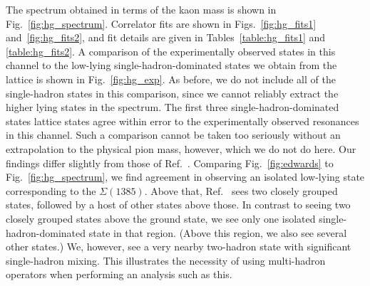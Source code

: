 The spectrum obtained in terms of the kaon mass is shown in Fig.~\ref{fig:hg_spectrum}. Correlator fits are shown in Figs.~\ref{fig:hg_fits1} and~\ref{fig:hg_fits2}, and fit details are given in Tables~\ref{table:hg_fits1} and \ref{table:hg_fits2}. A comparison of the experimentally observed states in this channel to the low-lying single-hadron-dominated states we obtain from the lattice is shown in Fig.~\ref{fig:hg_exp}. As before, we do not include all of the single-hadron states in this comparison, since we cannot reliably extract the higher lying states in the spectrum. The first three single-hadron-dominated states lattice states agree within error to the experimentally observed resonances in this channel. Such a comparison cannot be taken too seriously without an extrapolation to the physical pion mass, however, which we do not do here. Our findings differ slightly from those of Ref.~\cite{Edwards:2012fx}. Comparing Fig.~\ref{fig:edwards} to Fig.~\ref{fig:hg_spectrum}, we find agreement in observing an isolated low-lying state corresponding to the $\Sigma(1385)$. Above that, Ref.~\cite{Edwards:2012fx} sees two closely grouped states, followed by a host of other states above those. In contrast to seeing two closely grouped states above the ground state, we see only one isolated single-hadron-dominated state in that region. (Above this region, we also see several other states.) We, however, see a very nearby two-hadron state with significant single-hadron mixing. This illustrates the necessity of using multi-hadron operators when performing an analysis such as this.
